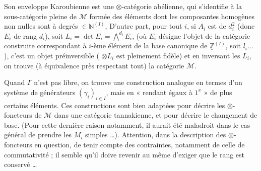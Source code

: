 \documentclass[11pt,a4paper]{article}
\begin{document}

Son enveloppe Karoubienne est une $\otimes$-catégorie abélienne, qui
s'identifie à la sous-catégorie pleine de $\mathcal{M}$ formée des éléments
dont les composantes homogènes non nulles sont à degrés
$\in \underline{\mathbb{N}}^{(I)}$,  D'autre part, pour tout $i$, si $A_{i}$ est de
 $d_{i}^{2}$ (donc $E_{i}$ de rang $d_{i}$), soit
$L_{i} = \det E_{i} = \bigwedge^{d_{i}} E_{i}$, (où $E_{i}$ désigne
l'objet de la catégorie construite correspondant à \struck{\ill{}}
$i$-ème élément de la base canonique de
$\underline{\mathbb{Z}}^{(I)}$, soit $l_{i} \dots$), c'est un objet
préinversible ( $\otimes L_{i}$ est pleinement fidèle) et en
inversant les $L_{i}$, on trouve (à  équivalence près
respectant tout) la catégorie $\mathcal{M}$.

Quand $\Gamma$ n'est pas libre, on trouve une construction analogue en
termes d'un système de générateurs 
$(\gamma_{i})_{i \in I}$, mais en « rendant  égaux à
$1^{x}$ » de plus certains éléments. Ces constructions sont bien adaptées
pour décrire les $\otimes$-foncteurs de $\mathcal{M}$ dans une
\struck{\ill{}} catégorie tannakienne, et pour décrire le changement de
base. (Pour cette dernière raison notamment, il aurait été maladroit dans
le cas général de prendre les $M_{i}$ simples …). Attention, dans la
description des $\otimes$-foncteurs en question, de tenir compte des
contraintes, notamment de celle de commutativité ; il semble qu'il doive
revenir au même d'exiger que le rang est conservé …

\end{document}
